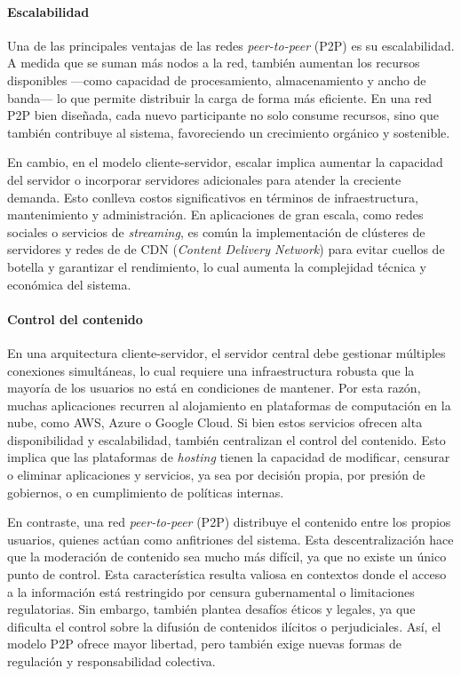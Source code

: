 \paragraph{Escalabilidad}
Una de las principales ventajas de las redes \textit{peer-to-peer} (P2P) es su escalabilidad. A medida que se suman más nodos a la red, también aumentan los recursos disponibles —como capacidad de procesamiento, almacenamiento y ancho de banda— lo que permite distribuir la carga de forma más eficiente. En una red P2P bien diseñada, cada nuevo participante no solo consume recursos, sino que también contribuye al sistema, favoreciendo un crecimiento orgánico y sostenible.

En cambio, en el modelo cliente-servidor, escalar implica aumentar la capacidad del servidor o incorporar servidores adicionales para atender la creciente demanda. Esto conlleva costos significativos en términos de infraestructura, mantenimiento y administración. En aplicaciones de gran escala, como redes sociales o servicios de \textit{streaming}, es común la implementación de clústeres de servidores y redes de de CDN (\textit{Content Delivery Network}) para evitar cuellos de botella y garantizar el rendimiento, lo cual aumenta la complejidad técnica y económica del sistema.

\paragraph{Control del contenido}
En una arquitectura cliente-servidor, el servidor central debe gestionar múltiples conexiones simultáneas, lo cual requiere una infraestructura robusta que la mayoría de los usuarios no está en condiciones de mantener. Por esta razón, muchas aplicaciones recurren al alojamiento en plataformas de computación en la nube, como AWS, Azure o Google Cloud. Si bien estos servicios ofrecen alta disponibilidad y escalabilidad, también centralizan el control del contenido. Esto implica que las plataformas de \textit{hosting} tienen la capacidad de modificar, censurar o eliminar aplicaciones y servicios, ya sea por decisión propia, por presión de gobiernos, o en cumplimiento de políticas internas.

En contraste, una red \textit{peer-to-peer} (P2P) distribuye el contenido entre los propios usuarios, quienes actúan como anfitriones del sistema. Esta descentralización hace que la moderación de contenido sea mucho más difícil, ya que no existe un único punto de control. Esta característica resulta valiosa en contextos donde el acceso a la información está restringido por censura gubernamental o limitaciones regulatorias. Sin embargo, también plantea desafíos éticos y legales, ya que dificulta el control sobre la difusión de contenidos ilícitos o perjudiciales. Así, el modelo P2P ofrece mayor libertad, pero también exige nuevas formas de regulación y responsabilidad colectiva.

